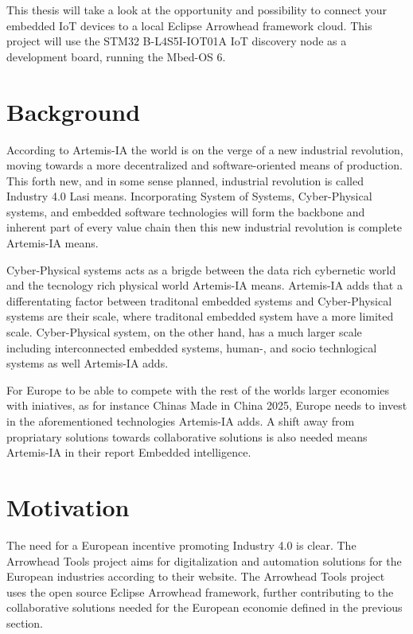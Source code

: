 This thesis will take a look at the opportunity and possibility to connect your embedded IoT devices to a local Eclipse Arrowhead framework cloud.
This project will use the STM32 B-L4S5I-IOT01A IoT discovery node as a development board, running the Mbed-OS 6. 
\section{Background}
According to Artemis-IA the world is on the verge of a new industrial revolution, moving towards a more decentralized and software-oriented means of production.\cite{Artemis2021}
This forth new, and in some sense planned, industrial revolution is called Industry 4.0 Lasi means.\cite{Lasi2014} 
Incorporating System of Systems, Cyber-Physical systems, and embedded software technologies will form the backbone and inherent part of every value chain then this new industrial revolution is complete Artemis-IA means.\cite{Artemis2021}

Cyber-Physical systems acts as a brigde between the data rich cybernetic world and the tecnology rich physical world Artemis-IA means.\cite{Artemis2021}
Artemis-IA adds that a differentating factor between traditonal embedded systems and Cyber-Physical systems are their scale, where traditonal embedded system have a more limited scale.\cite{Artemis2021}
Cyber-Physical system, on the other hand, has a much larger scale including interconnected embedded systems, human-, and socio technlogical systems as well Artemis-IA adds.\cite{Artemis2021}

For Europe to be able to compete with the rest of the worlds larger economies with iniatives, as for instance Chinas Made in China 2025, Europe needs to invest in the aforementioned technologies Artemis-IA adds.\cite{Artemis2021} 
A shift away from propriatary solutions towards collaborative solutions is also needed means Artemis-IA in their report Embedded intelligence.\cite{Artemis2021} 
\section{Motivation}
The need for a European incentive promoting Industry 4.0 is clear. 
The Arrowhead Tools project aims for digitalization and automation solutions for the European industries according to their website.\cite{AT2021}
The Arrowhead Tools project uses the open source Eclipse Arrowhead framework, further contributing to the collaborative solutions needed for the European economie defined in the previous section.

